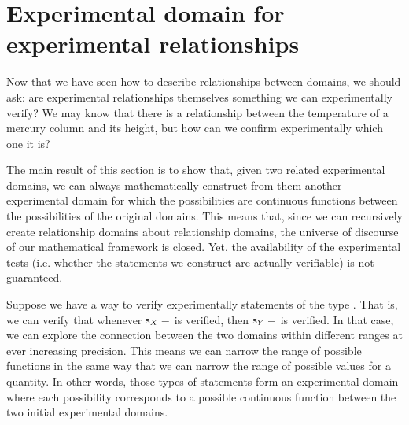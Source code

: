 \documentclass[11pt,letterpaper,fleqn]{memoir} %
\begin{document}
\section{Experimental domain for experimental relationships}

Now that we have seen how to describe relationships between domains, we should ask: are experimental relationships themselves something we can experimentally verify? We may know that there is a relationship between the temperature of a mercury column and its height, but how can we confirm experimentally which one it is?

The main result of this section is to show that, given two related experimental domains, we can always mathematically construct from them another experimental domain for which the possibilities are continuous functions between the possibilities of the original domains. This means that, since we can recursively create relationship domains about relationship domains, the universe of discourse of our mathematical framework is closed. Yet, the availability of the experimental tests (i.e. whether the statements we construct are actually verifiable) is not guaranteed.

Suppose we have a way to verify experimentally statements of the type . That is, we can verify that whenever $\mathsf{s}_X=$ is verified, then $\mathsf{s}_Y=$ is verified. In that case, we can explore the connection between the two domains within different ranges at ever increasing precision. This means we can narrow the range of possible functions in the same way that we can narrow the range of possible values for a quantity. In other words, those types of statements form an experimental domain where each possibility corresponds to a possible continuous function between the two initial experimental domains.
\end{document}
